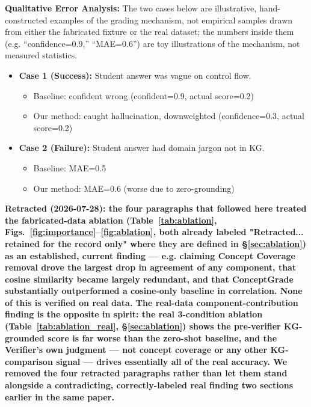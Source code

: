 \documentclass[conference]{IEEEtran}
\begin{document}
\textbf{Qualitative Error Analysis:}
The two cases below are illustrative, hand-constructed examples of the
grading mechanism, not empirical samples drawn from either the
fabricated fixture or the real dataset; the numbers inside them (e.g.
``confidence=0.9,'' ``MAE=0.6'') are toy illustrations of the mechanism,
not measured statistics.
\begin{itemize}
  \item \textbf{Case 1 (Success):} Student answer was vague on control flow.
  \begin{itemize}
    \item Baseline: confident wrong (confident=0.9, actual score=0.2)
    \item Our method: caught hallucination, downweighted (confidence=0.3, actual score=0.2)
  \end{itemize}
  \item \textbf{Case 2 (Failure):} Student answer had domain jargon not in KG.
  \begin{itemize}
    \item Baseline: MAE=0.5
    \item Our method: MAE=0.6 (worse due to zero-grounding)
  \end{itemize}
\end{itemize}

\textbf{Retracted (2026-07-28): the four paragraphs that followed here
treated the fabricated-data ablation (Table~\ref{tab:ablation}, Figs.~\ref{fig:importance}--\ref{fig:ablation},
both already labeled "Retracted... retained for the record only" where
they are defined in \S\ref{sec:ablation}) as an established, current
finding --- e.g. claiming Concept Coverage removal drove the largest
drop in agreement of any component, that cosine similarity became
largely redundant, and that ConceptGrade substantially outperformed a
cosine-only baseline in correlation. None of this is verified on real data. The
real-data component-contribution finding is the opposite in spirit: the
real 3-condition ablation (Table~\ref{tab:ablation_real},
\S\ref{sec:ablation}) shows the pre-verifier KG-grounded score is far
worse than the zero-shot baseline, and the Verifier's own judgment ---
not concept coverage or any other KG-comparison signal --- drives
essentially all of the real accuracy. We removed the four retracted
paragraphs rather than let them stand alongside a contradicting,
correctly-labeled real finding two sections earlier in the same paper.}

\end{document}
